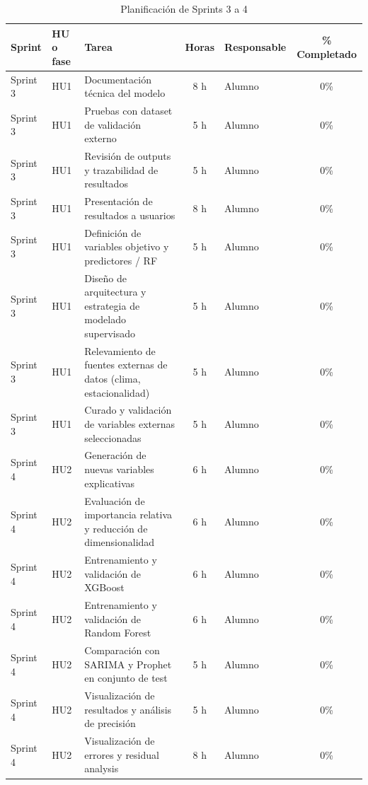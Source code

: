 \documentclass[
11pt, %
]{charter}
\begin{document}
\begin{table}[htpb]
\centering
\caption{Planificación de Sprints 3 a 4}
\begin{tabularx}{\linewidth}{@{}|l|l|X|c|l|c|@{}}
\hline
\rowcolor[HTML]{C0C0C0}
Sprint & HU o fase & Tarea & Horas & Responsable & \% Completado \\ \hline
Sprint 3 & HU1 & Documentación técnica del modelo & 8 h & Alumno & 0\% \\ \hline
Sprint 3 & HU1 & Pruebas con dataset de validación externo & 5 h & Alumno & 0\% \\ \hline
Sprint 3 & HU1 & Revisión de outputs y trazabilidad de resultados & 5 h & Alumno & 0\% \\ \hline
Sprint 3 & HU1 & Presentación de resultados a usuarios & 8 h & Alumno & 0\% \\ \hline
Sprint 3 & HU1 & Definición de variables objetivo y predictores / RF & 5 h & Alumno & 0\% \\ \hline
Sprint 3 & HU1 & Diseño de arquitectura y estrategia de modelado supervisado & 5 h & Alumno & 0\% \\ \hline
Sprint 3 & HU1 & Relevamiento de fuentes externas de datos (clima, estacionalidad) & 5 h & Alumno & 0\% \\ \hline
Sprint 3 & HU1 & Curado y validación de variables externas seleccionadas & 5 h & Alumno & 0\% \\ \hline
\hline
Sprint 4 & HU2 & Generación de nuevas variables explicativas & 6 h & Alumno & 0\% \\ \hline
Sprint 4 & HU2 & Evaluación de importancia relativa y reducción de dimensionalidad & 6 h & Alumno & 0\% \\ \hline
Sprint 4 & HU2 & Entrenamiento y validación de XGBoost & 6 h & Alumno & 0\% \\ \hline
Sprint 4 & HU2 & Entrenamiento y validación de Random Forest & 6 h & Alumno & 0\% \\ \hline
Sprint 4 & HU2 & Comparación con SARIMA y Prophet en conjunto de test & 5 h & Alumno & 0\% \\ \hline
Sprint 4 & HU2 & Visualización de resultados y análisis de precisión & 5 h & Alumno & 0\% \\ \hline
Sprint 4 & HU2 & Visualización de errores y residual analysis & 8 h & Alumno & 0\% \\ \hline
\end{tabularx}
\end{table}
\end{document}
